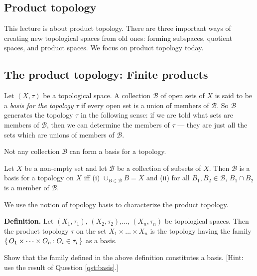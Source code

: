 \begin{center}
  \section{Product topology}
\end{center}

\setcounter{section}{4}

This lecture is about product topology.
There are three important ways of creating new topological spaces from old ones:
forming subspaces, quotient spaces, and product spaces. We focus on product topology today.

\subsection{The product topology: Finite products}


Let $(X, \tau)$ be a topological space.
A collection $\mathcal B$ of open sets of $X$ is said to be a \textit{basis for the topology} $\tau$ if
every open set is a union of members of $\mathcal B$.
So $\mathcal B$ generates the topology $\tau$
in the following sense: if we are told what sets are members of $\mathcal B$, then we can determine the members of
$\tau$ --- they are just all the sets which are unions of members of $\mathcal B$.

Not any collection $\mathcal B$ can form a basis for a topology.

\begin{qst}\label{qst:basis}
  Let $X$ be a non-empty set and let $\mathcal B$ be a collection of subsets of $X$.
  Then $\mathcal B$ is a basis for a topology on $X$ iff (i) $\cup_{B \in \mathcal B} B = X$ and (ii) for all $B_1,B_2 \in \mathcal B$,  $B_1 \cap B_2$ is a member of $\mathcal B$. 
\end{qst}

We use the notion of topology basis to characterize the product topology.


\noindent \textbf{Definition.} 
Let $(X_1, \tau_1)$, $(X_2, \tau_2)$,..., $(X_n, \tau_n)$ be topological spaces.
Then the product topology $\tau$ on the set
$X_1 \times \dots \times X_n$ is the topology having the family $\set{O_1\times \dots \times O_n \colon O_i \in \tau_i}$ as a basis.

\begin{qst}
  Show that the family defined in the above definition constitutes a basis. [Hint: use the result of Question \ref{qst:basis}.]
\end{qst}

